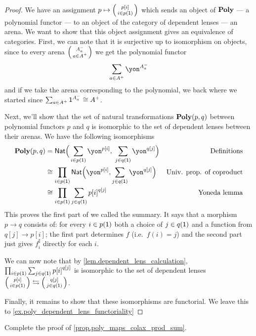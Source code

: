 \documentclass[Book-Poly]{subfiles}
\begin{document}
\begin{proof}
We have an assignment $p \mapsto \lens{p[i]}{i \in p(\1)}$ which sends an object
of $\textbf{Poly}$ --- a polynomial functor --- to an object of the category of
dependent lenses --- an arena. We want to show that this object assignment gives
an equivalence of categories. First, we can note that it is surjective up to isomorphism on
objects, since to every arena $\lens{A^-_{a}}{a \in A^+}$ we get the polynomial
functor
\[\sum_{a \in A^+} \yon^{A^-_{a}}\]
and if we take the arena corresponding to the polynomial, we back where we
started since $\sum_{a \in A^+} \textsf{1}^{A^-_{a}} \cong A^+$.

Next, we'll show that the set of natural transformations $\textbf{Poly}(p,q)$ between polynomial functors $p$
and $q$ is isomorphic to the set of dependent lenses between their arenas. We have the following isomorphisms
\begin{align*}
 \poly(p,q)&=
 \nat\Big(\sum_{i\in p(\1)}\yon^{p[i]},\;\sum_{j\in q(\1)}\yon^{q[j]}\Big)&
 	\text{Definitions}\\&\cong
 \prod_{i\in p(\1)}\nat\Big(\yon^{p[i]},\sum_{j\in q(\1)}\yon^{q[j]}\Big)&
 	\text{Univ. prop. of coproduct}\\&\cong
 \prod_{i\in p(\1)}\sum_{j\in q(\1)}{p[i]}^{q[j]}&
 	\text{Yoneda lemma}
\end{align*}
This proves the first part of we called the summary. It says that a morphism
$p\to q$ consists of: for every $i\in p(\textsf{1})$ both a choice of $j\in q(\textsf{1})$ and a
function from $q[j]\to p[i]$; the first part determines $f$ (i.e.\ $f(i)=j$) and
the second part just gives $f^\sharp_i$ directly for each $i$.

We can now note that by \cref{lem.dependent_lens_calculation}, $\prod_{i\in
 p(\textsf{1})}\sum_{j\in q(\textsf{1})}{p[i]}^{q[j]}$ is isomorphic to the set of dependent
lenses $\lens{p[i]}{i \in p(\1)} \fromto \lens{q[j]}{j \in q(\1)}$.

Finally, it remains to show that these isomorphisms are functorial. We leave
this to \cref{ex.poly_dependent_lens_functoriality}
\end{proof}

\begin{exercise}\label{ex.poly_dependent_lens_functoriality}
Complete the proof of \cref{prop.poly_maps_colax_prod_sum}.
\end{exercise}

%
\end{document}
